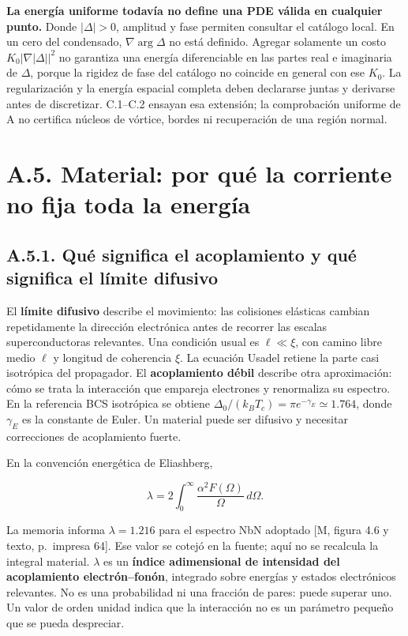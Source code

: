 \documentclass[
  spanish,
  10pt,
  a4paper,
]{article}
\begin{document}
\textbf{La energía uniforme todavía no define una PDE válida en
cualquier punto.} Donde \(|\Delta|>0\), amplitud y fase permiten
consultar el catálogo local. En un cero del condensado,
\(\nabla\arg\Delta\) no está definido. Agregar solamente un costo
\(K_0|\nabla|\Delta||^2\) no garantiza una energía diferenciable en las
partes real e imaginaria de \(\Delta\), porque la rigidez de fase del
catálogo no coincide en general con ese \(K_0\). La regularización y la
energía espacial completa deben declararse juntas y derivarse antes de
discretizar. C.1--C.2 ensayan esa extensión; la comprobación uniforme de
A no certifica núcleos de vórtice, bordes ni recuperación de una región
normal.

\section{A.5. Material: por qué la corriente no fija toda la
energía}\label{a.5.-material-por-quuxe9-la-corriente-no-fija-toda-la-energuxeda}

\subsection{A.5.1. Qué significa el acoplamiento y qué significa el
límite
difusivo}\label{a.5.1.-quuxe9-significa-el-acoplamiento-y-quuxe9-significa-el-luxedmite-difusivo}

El \textbf{límite difusivo} describe el movimiento: las colisiones
elásticas cambian repetidamente la dirección electrónica antes de
recorrer las escalas superconductoras relevantes. Una condición usual es
\(\ell\ll\xi\), con camino libre medio \(\ell\) y longitud de coherencia
\(\xi\). La ecuación Usadel retiene la parte casi isotrópica del
propagador. El \textbf{acoplamiento débil} describe otra aproximación:
cómo se trata la interacción que empareja electrones y renormaliza su
espectro. En la referencia BCS isotrópica se obtiene
\(\Delta_0/(k_BT_c)=\pi e^{-\gamma_E}\simeq1.764\), donde \(\gamma_E\)
es la constante de Euler. Un material puede ser difusivo y necesitar
correcciones de acoplamiento fuerte.

En la convención energética de Eliashberg,

\[
\lambda=2\int_0^\infty\frac{\alpha^2F(\Omega)}{\Omega}\,d\Omega.
\tag{A.26}
\]

La memoria informa \(\lambda=1.216\) para el espectro NbN adoptado {[}M,
figura 4.6 y texto, p.~impresa 64{]}. Ese valor se cotejó en la fuente;
aquí no se recalcula la integral material. \(\lambda\) es un
\textbf{índice adimensional de intensidad del acoplamiento
electrón--fonón}, integrado sobre energías y estados electrónicos
relevantes. No es una probabilidad ni una fracción de pares: puede
superar uno. Un valor de orden unidad indica que la interacción no es un
parámetro pequeño que se pueda despreciar.
\end{document}
